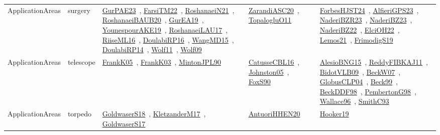 {\begin{longtable}{lp{3cm}>{\raggedright\arraybackslash}p{6cm}>{\raggedright\arraybackslash}p{6cm}>{\raggedright\arraybackslash}p{8cm}}
ApplicationAreas & surgery & \href{../works/GurPAE23.pdf}{GurPAE23}~\cite{GurPAE23}, \href{../works/FarsiTM22.pdf}{FarsiTM22}~\cite{FarsiTM22}, \href{../works/RoshanaeiN21.pdf}{RoshanaeiN21}~\cite{RoshanaeiN21}, \href{../works/RoshanaeiBAUB20.pdf}{RoshanaeiBAUB20}~\cite{RoshanaeiBAUB20}, \href{../works/GurEA19.pdf}{GurEA19}~\cite{GurEA19}, \href{../works/YounespourAKE19.pdf}{YounespourAKE19}~\cite{YounespourAKE19}, \href{../works/RoshanaeiLAU17.pdf}{RoshanaeiLAU17}~\cite{RoshanaeiLAU17}, \href{../works/RiiseML16.pdf}{RiiseML16}~\cite{RiiseML16}, \href{../works/DoulabiRP16.pdf}{DoulabiRP16}~\cite{DoulabiRP16}, \href{../works/WangMD15.pdf}{WangMD15}~\cite{WangMD15}, \href{../works/DoulabiRP14.pdf}{DoulabiRP14}~\cite{DoulabiRP14}, \href{../works/Wolf11.pdf}{Wolf11}~\cite{Wolf11}, \href{../works/Wolf09.pdf}{Wolf09}~\cite{Wolf09} & \href{../works/ZarandiASC20.pdf}{ZarandiASC20}~\cite{ZarandiASC20}, \href{../works/TopalogluO11.pdf}{TopalogluO11}~\cite{TopalogluO11} & \href{../works/ForbesHJST24.pdf}{ForbesHJST24}~\cite{ForbesHJST24}, \href{../works/AlfieriGPS23.pdf}{AlfieriGPS23}~\cite{AlfieriGPS23}, \href{../works/NaderiBZR23.pdf}{NaderiBZR23}~\cite{NaderiBZR23}, \href{../works/NaderiBZ23.pdf}{NaderiBZ23}~\cite{NaderiBZ23}, \href{../works/NaderiBZ22.pdf}{NaderiBZ22}~\cite{NaderiBZ22}, \href{../works/ElciOH22.pdf}{ElciOH22}~\cite{ElciOH22}, \href{../works/Lemos21.pdf}{Lemos21}~\cite{Lemos21}, \href{../works/FrimodigS19.pdf}{FrimodigS19}~\cite{FrimodigS19}\\
ApplicationAreas & telescope & \href{../works/FrankK05.pdf}{FrankK05}~\cite{FrankK05}, \href{../works/FrankK03.pdf}{FrankK03}~\cite{FrankK03}, \href{../works/MintonJPL90.pdf}{MintonJPL90}~\cite{MintonJPL90} & \href{../works/CatusseCBL16.pdf}{CatusseCBL16}~\cite{CatusseCBL16}, \href{../works/Johnston05.pdf}{Johnston05}~\cite{Johnston05}, \href{../works/FoxS90.pdf}{FoxS90}~\cite{FoxS90} & \href{../works/AlesioBNG15.pdf}{AlesioBNG15}~\cite{AlesioBNG15}, \href{../works/ReddyFIBKAJ11.pdf}{ReddyFIBKAJ11}~\cite{ReddyFIBKAJ11}, \href{../works/BidotVLB09.pdf}{BidotVLB09}~\cite{BidotVLB09}, \href{../works/BeckW07.pdf}{BeckW07}~\cite{BeckW07}, \href{../works/GlobusCLP04.pdf}{GlobusCLP04}~\cite{GlobusCLP04}, \href{../works/Beck99.pdf}{Beck99}~\cite{Beck99}, \href{../works/BeckDDF98.pdf}{BeckDDF98}~\cite{BeckDDF98}, \href{../works/PembertonG98.pdf}{PembertonG98}~\cite{PembertonG98}, \href{../works/Wallace96.pdf}{Wallace96}~\cite{Wallace96}, \href{../works/SmithC93.pdf}{SmithC93}~\cite{SmithC93}\\
ApplicationAreas & torpedo & \href{../works/GoldwaserS18.pdf}{GoldwaserS18}~\cite{GoldwaserS18}, \href{../works/KletzanderM17.pdf}{KletzanderM17}~\cite{KletzanderM17}, \href{../works/GoldwaserS17.pdf}{GoldwaserS17}~\cite{GoldwaserS17} & \href{../works/AntuoriHHEN20.pdf}{AntuoriHHEN20}~\cite{AntuoriHHEN20} & \href{../works/Hooker19.pdf}{Hooker19}~\cite{Hooker19}\\

\end{longtable}}
